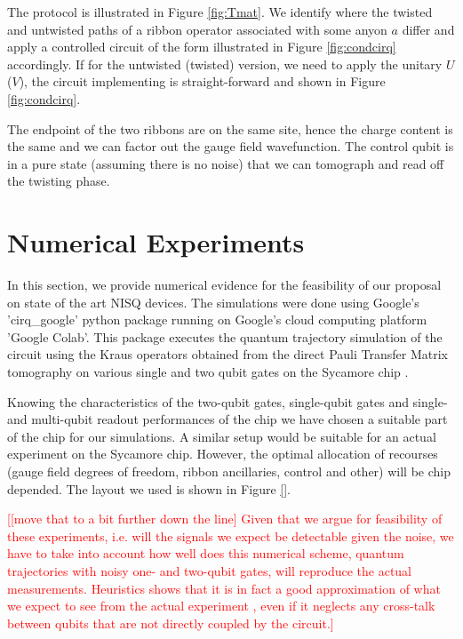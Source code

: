 \documentclass[two column]{article}
\newcommand{\caro}[1]{\textcolor{red}{[#1]}}
\begin{document}
The protocol is illustrated in Figure \ref{fig:Tmat}. We identify where the twisted and untwisted paths of a ribbon operator associated with some anyon $a$ differ and apply a controlled circuit of the form illustrated in Figure \ref{fig:condcirq} accordingly. If for the untwisted (twisted) version, we need to apply the unitary $U$ ($V$), the circuit implementing is straight-forward and shown in Figure \ref{fig:condcirq}.

The endpoint of the two ribbons are on the same site, hence the charge content is the same and we can factor out the gauge field wavefunction. 
The control qubit is in a pure state (assuming there is no noise) that we can tomograph and read off the twisting phase.


\section{Numerical Experiments}\label{sec:num}

In this section, we provide numerical evidence for the feasibility of our proposal on state of the art NISQ devices. The simulations were done using Google's 'cirq\_google' python package running on Google's cloud computing platform 'Google Colab'. This package executes the quantum trajectory simulation of the circuit using the Kraus operators obtained from the direct Pauli Transfer Matrix tomography on various single and two qubit gates on the Sycamore chip \cite{}.

Knowing the characteristics of the two-qubit gates, single-qubit gates and single- and multi-qubit readout performances of the chip \cite{} we have chosen a suitable part of the chip for our simulations. A similar setup would be suitable for an actual experiment on the Sycamore chip. However, the optimal allocation of recourses (gauge field degrees of freedom, ribbon ancillaries, control and other) will be chip depended. The layout we used is shown in Figure \ref{}.

\caro{[move that to a bit further down the line]
Given that we argue for feasibility of these experiments, i.e. will the signals we expect be detectable given the noise, we have to take into account how well does this numerical scheme, quantum trajectories with noisy one- and two-qubit gates, will reproduce the actual measurements.
Heuristics shows that it is in fact a good approximation of what we expect to see from the actual experiment \cite{}, even if it neglects any cross-talk between qubits that are not directly coupled by the circuit.}
\end{document}
